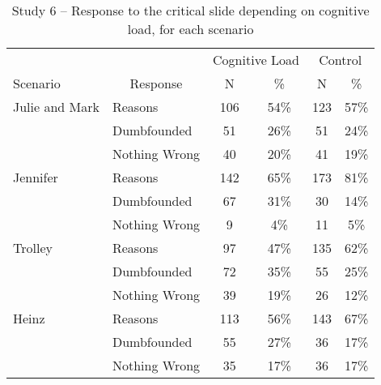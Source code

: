 \documentclass[
  american,
  man,floatsintext]{apa7}
\begin{document}
\begin{table}[tbp]

\begin{center}
\begin{threeparttable}

\caption{\label{tab:tabS6tab1dumb1allIncest}Study 6 – Response to the critical slide depending on cognitive load, for each scenario}

\begin{tabular}{llcccc}
\toprule
 &  & \multicolumn{2}{c}{Cognitive Load} & \multicolumn{2}{c}{Control} \\
\cmidrule(r){3-4} \cmidrule(r){5-6}
Scenario & \multicolumn{1}{c}{Response} & \multicolumn{1}{c}{N} & \multicolumn{1}{c}{\%} & \multicolumn{1}{c}{N} & \multicolumn{1}{c}{\%}\\
\midrule
Julie and Mark & Reasons & 106 & 54\% & 123 & 57\%\\
 & Dumbfounded & 51 & 26\% & 51 & 24\%\\
 & Nothing Wrong & 40 & 20\% & 41 & 19\%\\
Jennifer & Reasons & 142 & 65\% & 173 & 81\%\\
 & Dumbfounded & 67 & 31\% & 30 & 14\%\\
 & Nothing Wrong & 9 & 4\% & 11 & 5\%\\
Trolley & Reasons & 97 & 47\% & 135 & 62\%\\
 & Dumbfounded & 72 & 35\% & 55 & 25\%\\
 & Nothing Wrong & 39 & 19\% & 26 & 12\%\\
Heinz & Reasons & 113 & 56\% & 143 & 67\%\\
 & Dumbfounded & 55 & 27\% & 36 & 17\%\\
 & Nothing Wrong & 35 & 17\% & 36 & 17\%\\
\bottomrule
\end{tabular}

\end{threeparttable}
\end{center}

\end{table}
\end{document}
